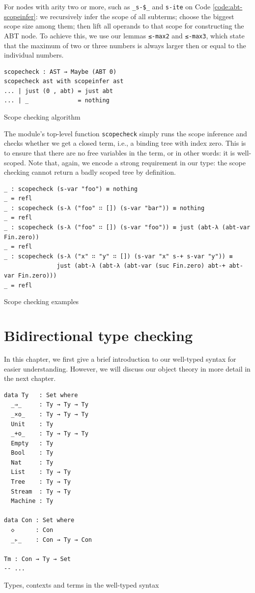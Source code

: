 For nodes with arity two or more, such as \verb$_s-$\verb=$=\verb$_$ and \verb$s-ite$ on Code \ref{code:abt-scopeinfer}: we recursively infer the scope of all subterms; choose the biggest scope size among them; then lift all operands to that scope for constructing the ABT node. To achieve this, we use our lemmas \verb$≤-max2$ and \verb$≤-max3$, which state that the maximum of two or three numbers is always larger then or equal to the individual numbers.

\begin{listing}[H]
\begin{verbatim}
scopecheck : AST → Maybe (ABT 0)
scopecheck ast with scopeinfer ast
... | just (0 , abt) = just abt
... | _              = nothing
\end{verbatim}
\caption{Scope checking algorithm}
\label{code:abt-scopecheck}
\end{listing}

The module's top-level function \verb$scopecheck$ simply runs the scope inference and checks whether we get a closed term, i.e., a binding tree with index zero. This is to ensure that there are no free variables in the term, or in other words: it is well-scoped. Note that, again, we encode a strong requirement in our type: the scope checking cannot return a badly scoped tree by definition.

\begin{listing}[H]
\begin{verbatim}
_ : scopecheck (s-var "foo") ≡ nothing
_ = refl
_ : scopecheck (s-λ ("foo" ∷ []) (s-var "bar")) ≡ nothing
_ = refl
_ : scopecheck (s-λ ("foo" ∷ []) (s-var "foo")) ≡ just (abt-λ (abt-var Fin.zero))
_ = refl
_ : scopecheck (s-λ ("x" ∷ "y" ∷ []) (s-var "x" s-+ s-var "y")) ≡
               just (abt-λ (abt-λ (abt-var (suc Fin.zero) abt-+ abt-var Fin.zero)))
_ = refl
\end{verbatim}
\caption{Scope checking examples}
\label{code:abt-scopecheck-ex}
\end{listing}

\section{Bidirectional type checking} \label{sec:typecheck}

In this chapter, we first give a brief introduction to our well-typed syntax for easier understanding. However, we will discuss our object theory in more detail in the next chapter.

\begin{listing}[H]
\begin{verbatim}
data Ty   : Set where
  _⇒_     : Ty → Ty → Ty
  _×o_    : Ty → Ty → Ty
  Unit    : Ty
  _+o_    : Ty → Ty → Ty
  Empty   : Ty
  Bool    : Ty
  Nat     : Ty
  List    : Ty → Ty
  Tree    : Ty → Ty
  Stream  : Ty → Ty
  Machine : Ty

data Con : Set where
  ◇      : Con
  _▹_    : Con → Ty → Con

Tm : Con → Ty → Set
-- ...
\end{verbatim}
\caption{Types, contexts and terms in the well-typed syntax}
\label{code:typecheck-ty}
\end{listing}

